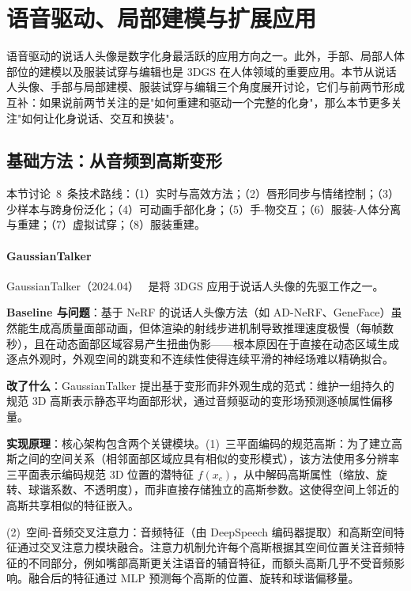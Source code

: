 \section{语音驱动、局部建模与扩展应用}
\label{sec:16_3}

语音驱动的说话人头像是数字化身最活跃的应用方向之一。此外，手部、局部人体部位的建模以及服装试穿与编辑也是 3DGS 在人体领域的重要应用。本节从说话人头像、手部与局部建模、服装试穿与编辑三个角度展开讨论，它们与前两节形成互补：如果说前两节关注的是"如何重建和驱动一个完整的化身"，那么本节更多关注"如何让化身说话、交互和换装"。

\subsection{基础方法：从音频到高斯变形}

本节讨论~8~条技术路线：（1）实时与高效方法；（2）唇形同步与情绪控制；（3）少样本与跨身份泛化；（4）可动画手部化身；（5）手-物交互；（6）服装-人体分离与重建；（7）虚拟试穿；（8）服装重建。

\paragraph{GaussianTalker}

GaussianTalker（2024.04）~\cite{2404_16012} 是将 3DGS 应用于说话人头像的先驱工作之一。

\textbf{Baseline 与问题}：基于 NeRF 的说话人头像方法（如 AD-NeRF、GeneFace）虽然能生成高质量面部动画，但体渲染的射线步进机制导致推理速度极慢（每帧数秒），且在动态面部区域容易产生扭曲伪影——根本原因在于直接在动态区域生成逐点外观时，外观空间的跳变和不连续性使得连续平滑的神经场难以精确拟合。

\textbf{改了什么}：GaussianTalker 提出基于变形而非外观生成的范式：维护一组持久的规范 3D 高斯表示静态平均面部形状，通过音频驱动的变形场预测逐帧属性偏移量。

\textbf{实现原理}：核心架构包含两个关键模块。(1)~三平面编码的规范高斯：为了建立高斯之间的空间关系（相邻面部区域应具有相似的变形模式），该方法使用多分辨率三平面表示编码规范 3D 位置的潜特征 $f(x_c)$，从中解码高斯属性（缩放、旋转、球谐系数、不透明度），而非直接存储独立的高斯参数。这使得空间上邻近的高斯共享相似的特征嵌入。

(2)~空间-音频交叉注意力：音频特征（由 DeepSpeech 编码器提取）和高斯空间特征通过交叉注意力模块融合。注意力机制允许每个高斯根据其空间位置关注音频特征的不同部分，例如嘴部高斯更关注语音的辅音特征，而额头高斯几乎不受音频影响。融合后的特征通过 MLP 预测每个高斯的位置、旋转和球谐偏移量。


